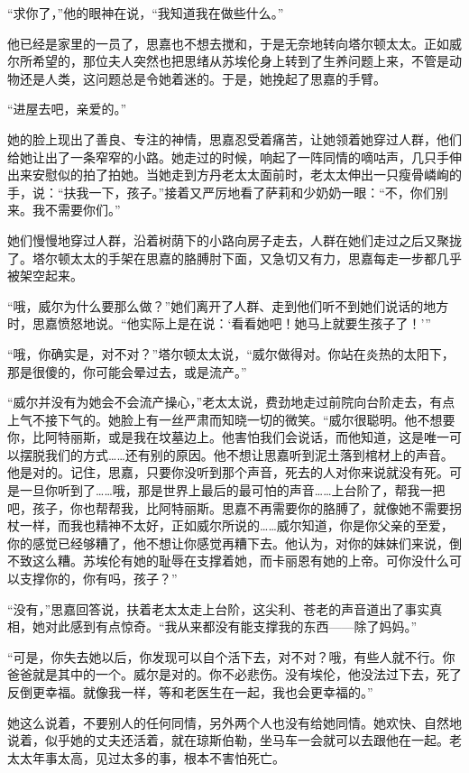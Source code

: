 \par “求你了，”他的眼神在说，“我知道我在做些什么。”
\par 他已经是家里的一员了，思嘉也不想去搅和，于是无奈地转向塔尔顿太太。正如威尔所希望的，那位夫人突然也把思绪从苏埃伦身上转到了生养问题上来，不管是动物还是人类，这问题总是令她着迷的。于是，她挽起了思嘉的手臂。
\par “进屋去吧，亲爱的。”
\par 她的脸上现出了善良、专注的神情，思嘉忍受着痛苦，让她领着她穿过人群，他们给她让出了一条窄窄的小路。她走过的时候，响起了一阵同情的嘀咕声，几只手伸出来安慰似的拍了拍她。当她走到方丹老太太面前时，老太太伸出一只瘦骨嶙峋的手，说：“扶我一下，孩子。”接着又严厉地看了萨莉和少奶奶一眼：“不，你们别来。我不需要你们。”
\par 她们慢慢地穿过人群，沿着树荫下的小路向房子走去，人群在她们走过之后又聚拢了。塔尔顿太太的手架在思嘉的胳膊肘下面，又急切又有力，思嘉每走一步都几乎被架空起来。
\par “哦，威尔为什么要那么做？”她们离开了人群、走到他们听不到她们说话的地方时，思嘉愤怒地说。“他实际上是在说：‘看看她吧！她马上就要生孩子了！'”
\par “哦，你确实是，对不对？”塔尔顿太太说，“威尔做得对。你站在炎热的太阳下，那是很傻的，你可能会晕过去，或是流产。”
\par “威尔并没有为她会不会流产操心，”老太太说，费劲地走过前院向台阶走去，有点上气不接下气的。她脸上有一丝严肃而知晓一切的微笑。“威尔很聪明。他不想要你，比阿特丽斯，或是我在坟墓边上。他害怕我们会说话，而他知道，这是唯一可以摆脱我们的方式……还有别的原因。他不想让思嘉听到泥土落到棺材上的声音。他是对的。记住，思嘉，只要你没听到那个声音，死去的人对你来说就没有死。可是一旦你听到了……哦，那是世界上最后的最可怕的声音……上台阶了，帮我一把吧，孩子，你也帮帮我，比阿特丽斯。思嘉不再需要你的胳膊了，就像她不需要拐杖一样，而我也精神不太好，正如威尔所说的……威尔知道，你是你父亲的至爱，你的感觉已经够糟了，他不想让你感觉再糟下去。他认为，对你的妹妹们来说，倒不致这么糟。苏埃伦有她的耻辱在支撑着她，而卡丽恩有她的上帝。可你没什么可以支撑你的，你有吗，孩子？”
\par “没有，”思嘉回答说，扶着老太太走上台阶，这尖利、苍老的声音道出了事实真相，她对此感到有点惊奇。“我从来都没有能支撑我的东西——除了妈妈。”
\par “可是，你失去她以后，你发现可以自个活下去，对不对？哦，有些人就不行。你爸爸就是其中的一个。威尔是对的。你不必悲伤。没有埃伦，他没法过下去，死了反倒更幸福。就像我一样，等和老医生在一起，我也会更幸福的。”
\par 她这么说着，不要别人的任何同情，另外两个人也没有给她同情。她欢快、自然地说着，似乎她的丈夫还活着，就在琼斯伯勒，坐马车一会就可以去跟他在一起。老太太年事太高，见过太多的事，根本不害怕死亡。
